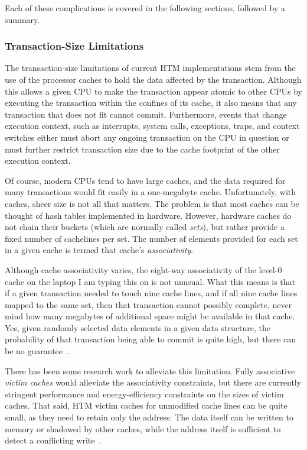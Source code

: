 Each of these complications is covered in the following sections,
followed by a summary.

\subsubsection{Transaction-Size Limitations}
\label{sec:future:Transaction-Size Limitations}

The transaction-size limitations of current HTM implementations
stem from the use of the processor caches to hold the data
affected by the transaction.
Although this allows a given CPU to make the transaction appear atomic to
other CPUs by executing the transaction within the confines of its cache,
it also means that any transaction that does not fit cannot commit.
Furthermore, events that change execution context, such as interrupts,
system calls, exceptions, traps, and context switches either must
abort any ongoing transaction on the CPU in question or must further
restrict transaction size due to the cache footprint of the other
execution context.

Of course, modern CPUs tend to have large caches, and the data required
for many transactions would fit easily in a one-megabyte cache.
Unfortunately, with caches, sheer size is not all that matters.
The problem is that most caches
can be thought of hash tables implemented in hardware.
However, hardware caches do not chain their buckets (which are normally
called \emph{sets}), but rather
provide a fixed number of cachelines per set.
The number of elements provided for each set in a given cache
is termed that cache's \emph{associativity}.

Although cache associativity varies, the eight-way associativity of
the level-0 cache on the laptop I am typing this on is not unusual.
What this means is that if a given transaction needed to touch
nine cache lines, and if all nine cache lines mapped to the same
set, then that transaction cannot possibly complete, never mind how
many megabytes of additional space might be available in that cache.
Yes, given randomly selected data elements in a given data structure,
the probability of that transaction being able to commit is quite
high, but there can be no guarantee~\cite{PaulEMcKenney2012HTMCacheGeometry}.

There has been some research work to alleviate this limitation.
Fully associative \emph{victim caches} would alleviate the associativity
constraints, but there are currently stringent performance and
energy-efficiency constraints on the sizes of victim caches.
That said, HTM victim caches for unmodified cache lines can be quite
small, as they need to retain only the address:
The data itself can be written to memory or shadowed by other caches,
while the address itself is sufficient to detect a conflicting
write~\cite{RaviRajwar2012TSX}.


